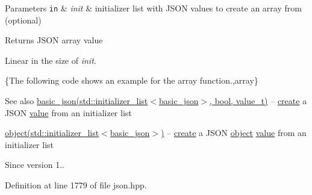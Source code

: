 \begin{DoxyParams}[1]{Parameters}
\mbox{\tt in}  & {\em init} & initializer list with J\+S\+O\+N values to create an array from (optional)\\
\hline
\end{DoxyParams}
\begin{DoxyReturn}{Returns}
J\+S\+O\+N array value
\end{DoxyReturn}
Linear in the size of {\itshape init}.

\{The following code shows an example for the {\ttfamily array} function.,array\}

\begin{DoxySeeAlso}{See also}
\hyperlink{classnlohmann_1_1basic__json_afeb998aec45296bc2050bd1c41ef41eb}{basic\+\_\+json(std\+::initializer\+\_\+list$<$basic\+\_\+json$>$, bool, value\+\_\+t)} -- \hyperlink{classnlohmann_1_1basic__json_a27df4303fbc83071275074486b54a40e}{create} a J\+S\+O\+N \hyperlink{classnlohmann_1_1basic__json_a0a2cbbd95862a623e7dc5c37e67dead0}{value} from an initializer list 

\hyperlink{classnlohmann_1_1basic__json_ad25b2f8c21e241e2d63455537a9294ff}{object(std\+::initializer\+\_\+list$<$basic\+\_\+json$>$)} -- \hyperlink{classnlohmann_1_1basic__json_a27df4303fbc83071275074486b54a40e}{create} a J\+S\+O\+N \hyperlink{classnlohmann_1_1basic__json_ad25b2f8c21e241e2d63455537a9294ff}{object} \hyperlink{classnlohmann_1_1basic__json_a0a2cbbd95862a623e7dc5c37e67dead0}{value} from an initializer list
\end{DoxySeeAlso}
\begin{DoxySince}{Since}
version 1.. 
\end{DoxySince}


Definition at line 1779 of file json.\+hpp.

\hypertarget{classnlohmann_1_1basic__json_ad25b2f8c21e241e2d63455537a9294ff}{}
